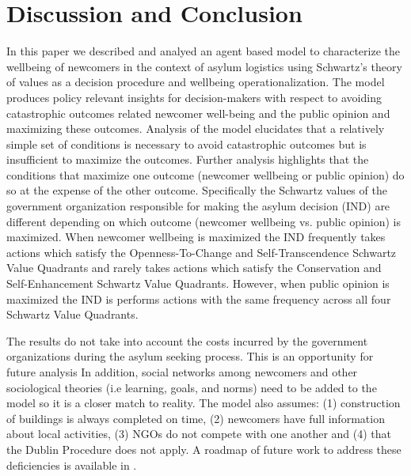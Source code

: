 \documentclass{scspaperproc}
\theoremstyle{scsthe}
\begin{document}

\section{Discussion and Conclusion}
\label{sec:discussion}
In this paper we described and analyed an agent based model to characterize the wellbeing of newcomers in the context of asylum logistics using Schwartz's theory of values as a decision procedure and wellbeing operationalization. The model produces policy relevant insights for decision-makers with respect to avoiding catastrophic outcomes related newcomer well-being and the public opinion and maximizing these outcomes. Analysis of the model elucidates that a relatively simple set of conditions is necessary to avoid catastrophic outcomes but is insufficient to maximize the outcomes. Further analysis highlights that the conditions that maximize one outcome (newcomer wellbeing or public opinion) do so at the expense of the other outcome. Specifically the Schwartz values of the government organization responsible for making the asylum decision (IND) are different depending on which outcome (newcomer wellbeing vs. public opinion) is maximized. When newcomer wellbeing is maximized the IND frequently takes actions which satisfy the Openness-To-Change and Self-Transcendence Schwartz Value Quadrants and rarely takes actions which satisfy the Conservation and Self-Enhancement Schwartz Value Quadrants. However, when public opinion is maximized the IND is performs actions with the same frequency across all four Schwartz Value Quadrants. 

The results do not take into account the costs incurred by the government organizations during the asylum seeking process. This is an opportunity for future analysis In addition, social networks among newcomers and other sociological theories (i.e learning, goals, and norms) need to be added to the model so it is a closer match to reality. The model also assumes: (1) construction of buildings is always completed on time, (2) newcomers have full information about local activities, (3) NGOs do not compete with one another and (4) that the Dublin Procedure does not apply. A roadmap of future work to address these deficiencies is available in \cite{phil.masters.thesis}. 
\end{document}
